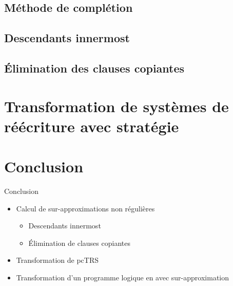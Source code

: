 \documentclass[xcolor={dvipsnames}]{beamer}
\begin{document}
\subsection{Méthode de complétion}


\subsection{Descendants innermost}


\subsection{Élimination des clauses copiantes}


\section{Transformation de systèmes de réécriture avec stratégie}


\section{Conclusion}

\begin{frame}{Conclusion}
  \begin{itemize}[<+->]
  \item Calcul de sur-approximations non régulières
    \begin{itemize}
    \item Descendants innermost
    \item Élimination de clauses copiantes
    \end{itemize}
  \item Transformation de pcTRS
  \item Transformation d'un programme logique en \csprogramme avec sur-approximation
  \end{itemize}
\end{frame}
\end{document}
